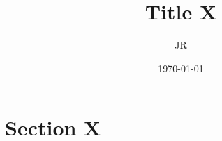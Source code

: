 \documentclass[9pt]{article}
\title{Title X}
\author{JR}
\date{\today}
\begin{document}
\maketitle
\tableofcontents
\newpage

\section{Section X}
 
\end{document}
